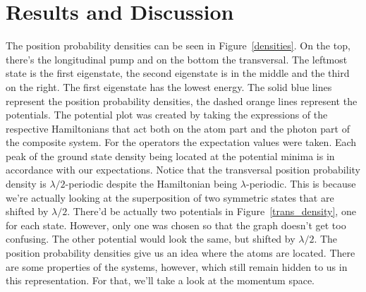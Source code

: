 \section{Results and Discussion}

The position probability densities can be seen in Figure~\ref{densities}. On the top, there's the longitudinal pump and on the bottom the transversal. The leftmost state is the first eigenstate, the second eigenstate is in the middle and the third on the right. The first eigenstate has the lowest energy. The solid blue lines represent the position probability densities, the dashed orange lines represent the potentials. The potential plot was created by taking the expressions of the respective Hamiltonians that act both on the atom part and the photon part of the composite system. For the operators the expectation values were taken. Each peak of the ground state density being located at the potential minima is in accordance with our expectations. Notice that the transversal position probability density is $\lambda / 2$-periodic despite the Hamiltonian being $\lambda$-periodic. This is because we're actually looking at the superposition of two symmetric states that are shifted by $\lambda / 2$. There'd be actually two potentials in Figure~\ref{trans_density}, one for each state. However, only one was chosen so that the graph doesn't get too confusing. The other potential would look the same, but shifted by $\lambda / 2$. The position probability densities give us an idea where the atoms are located. There are some properties of the systems, however, which still remain hidden to us in this representation. For that, we'll take a look at the momentum space.

